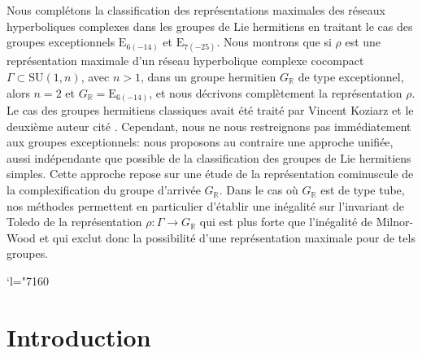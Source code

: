 \documentclass[JEP,XML,SOM,Unicode,NoFloatCountersInSection]{cedram}
\newcommand{\Changel}{\mathcode`l="7160}
\theoremstyle{plain}
\theoremstyle{definition}
\begin{document}
\begin{altabstract}
Nous complétons la classification des représentations maximales des réseaux hyperboliques complexes dans les groupes de Lie hermitiens en traitant le cas des groupes exceptionnels $\mathrm{E}_{6(-14)}$ et $\mathrm{E}_{7(-25)}$. Nous montrons que si $\rho$ est une représentation maximale d'un réseau hyper\-bo\-lique complexe cocompact $\Gamma \subset \mathrm{SU}(1,n)$, avec $n>1$, dans un groupe hermitien $G_\mathbb{R}$ de type exceptionnel, alors $n=2$ et $G_\mathbb{R} = \mathrm{E}_{6(-14)}$, et nous décrivons complètement la représentation $\rho$. Le cas des groupes hermitiens classiques avait été traité par Vincent Koziarz et le deuxième auteur cité \cite{KM}. Cependant, nous ne nous restreignons pas immédiatement aux groupes exceptionnels: nous proposons au contraire une approche unifiée, aussi indépendante que possible de la classification des groupes de Lie hermitiens simples. Cette approche repose sur une étude de la représentation cominuscule de la complexification du groupe d'arrivée $G_\mathbb{R}$. Dans le cas où $G_\mathbb{R}$ est de type tube, nos méthodes permettent en particulier d'établir une inégalité sur l'invariant de Toledo de la représentation $\rho:\Gamma\rightarrow G_\mathbb{R}$ qui est plus forte que l'inégalité de Milnor-Wood et qui exclut donc la possibilité d'une représentation maximale pour de tels groupes.\end{altabstract}



\maketitle

\newpage
\tableofcontents
\mainmatter

\bgroup
\Changel

\section{Introduction}
\end{document}

